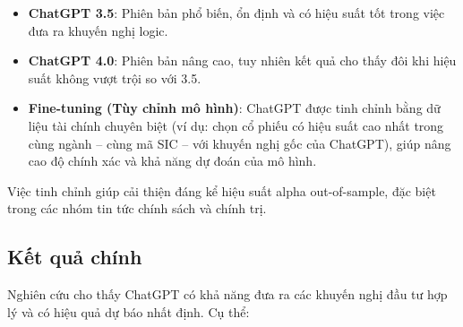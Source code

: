 \documentclass[a4paper,12pt]{article}
\begin{document}
\begin{itemize}
    \item \textbf{ChatGPT 3.5}: Phiên bản phổ biến, ổn định và có hiệu suất tốt trong việc đưa ra khuyến nghị logic.
    \item \textbf{ChatGPT 4.0}: Phiên bản nâng cao, tuy nhiên kết quả cho thấy đôi khi hiệu suất không vượt trội so với 3.5.
    \item \textbf{Fine-tuning (Tùy chỉnh mô hình)}: ChatGPT được tinh chỉnh bằng dữ liệu tài chính chuyên biệt (ví dụ: chọn cổ phiếu có hiệu suất cao nhất trong cùng ngành – cùng mã SIC – với khuyến nghị gốc của ChatGPT), giúp nâng cao độ chính xác và khả năng dự đoán của mô hình.
\end{itemize}

Việc tinh chỉnh giúp cải thiện đáng kể hiệu suất alpha out-of-sample, đặc biệt trong các nhóm tin tức chính sách và chính trị.


\subsection{Kết quả chính}

Nghiên cứu cho thấy ChatGPT có khả năng đưa ra các khuyến nghị đầu tư hợp lý và có hiệu quả dự báo nhất định. Cụ thể:
\end{document}
